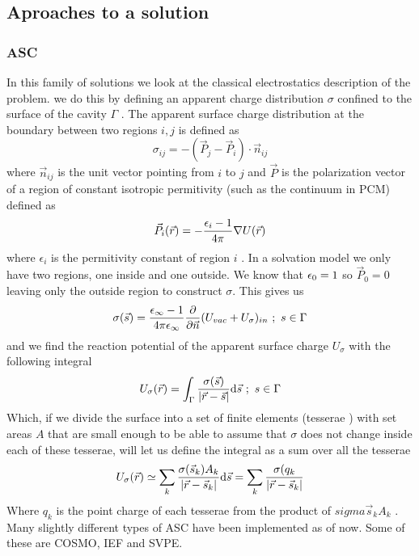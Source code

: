 \documentclass[../master_thesis.tex]{subfiles}
\begin{document}
\subsection{Aproaches to a solution}
\subsubsection{ \ac{ASC}}
In this family of solutions we look at the classical electrostatics description
of the problem. we do this by defining an apparent charge distribution
$\sigma$ confined to the surface of the cavity $\Gamma$ \cite{Tomasi:1994wt, Tomasi:2005ipa}.
The apparent surface charge distribution at the boundary between two regions $i, j$
is defined as
\begin{equation}
  \sigma_{ij} = -(\vec{P}_j - \vec{P}_i)\cdot\vec{n}_{ij}
\end{equation}
where $\vec{n}_{ij}$ is the unit vector pointing from $i$ to $j$ and $\vec{P}$ is
the polarization vector of a region of constant isotropic permitivity (such as
the continuum in \ac{PCM}) defined as
\begin{equation}
  \vec{P}_i (\vec{r}) = - \frac{\epsilon_i - 1}{4\pi}\nabla U(\vec{r})
\end{equation}
where $\epsilon_i$ is the permitivity constant of region $i$ \cite{Tomasi:2005ipa}.
In a solvation model we only have two regions, one inside and one outside. We
know that $\epsilon_{0} = 1$ so $\vec{P}_0 = 0$ leaving only the outside region to
construct $\sigma$. This gives us \cite{Tomasi:2005ipa}
\begin{equation}
  \sigma(\vec{s}) =\frac{\epsilon_{\infty} - 1}{4\pi\epsilon_{\infty}} \frac{\partial}{\partial\vec{n}} (U_{vac} + U_{\sigma})_{in}\ ;\ s \in \Gamma
\end{equation}
and we find the reaction potential of the apparent surface charge $U_{\sigma}$
with the following integral
 \begin{equation}
   U_{\sigma}(\vec{r}) = \int_{\Gamma}\frac{\sigma(\vec{s})}{\abs{\vec{r} - \vec{s}}} \text{d}\vec{s}\ ;\ s \in \Gamma
 \end{equation}
Which, if we divide the surface into a set of finite elements (tesserae
\cite{Tomasi:2005ipa, Sorland}) with set areas $A$ that are small enough to be able
to assume that $\sigma$ does not change inside each of these tesserae, will let us define the integral
as a sum over all the tesserae
\begin{equation}
   U_{\sigma}(\vec{r}) \simeq \sum_k\frac{\sigma(\vec{s}_k) A_k}{\abs{\vec{r} - \vec{s}_k}} \text{d}\vec{s}
   = \sum_k\frac{\sigma(q_k}{\abs{\vec{r} - \vec{s}_k}}
\end{equation}
Where $q_k$ is the point charge of each tesserae from the product of $sigma{\vec{s}_k}A_k$
\cite{Tomasi:2005ipa}.
Many slightly different types of \ac{ASC} have been implemented as of now. Some of these
are \ac{COSMO}, \ac{IEF} and \ac{SVPE}.
\end{document}
